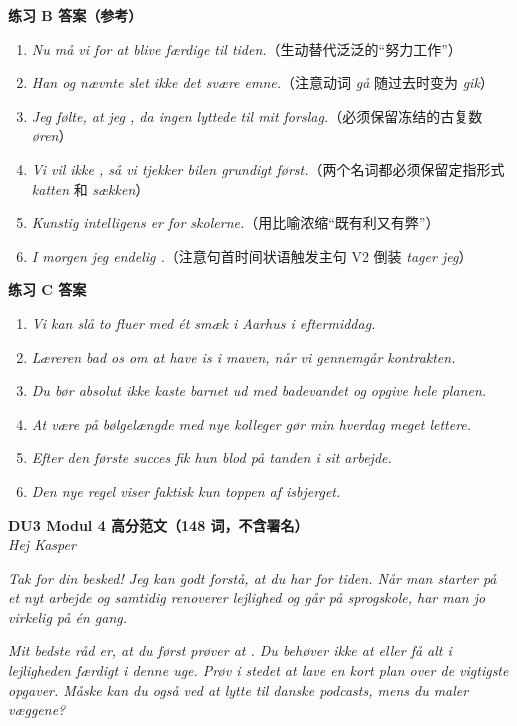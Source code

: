 \begin{answerbox}
\textbf{练习 B 答案（参考）}
\begin{enumerate}
  \item \textit{Nu må vi  for at blive færdige til tiden.}（生动替代泛泛的“努力工作”）
  \item \textit{Han  og nævnte slet ikke det svære emne.}（注意动词 \textit{gå} 随过去时变为 \textit{gik}）
  \item \textit{Jeg følte, at jeg , da ingen lyttede til mit forslag.}（必须保留冻结的古复数 \textit{øren}）
  \item \textit{Vi vil ikke , så vi tjekker bilen grundigt først.}（两个名词都必须保留定指形式 \textit{katten} 和 \textit{sækken}）
  \item \textit{Kunstig intelligens er  for skolerne.}（用比喻浓缩“既有利又有弊”）
  \item \textit{I morgen  jeg endelig .}（注意句首时间状语触发主句 V2 倒装 \textit{tager jeg}）
\end{enumerate}

\textbf{练习 C 答案}
\begin{enumerate}
  \item \textit{Vi kan slå to fluer med ét smæk i Aarhus i eftermiddag.}
  \item \textit{Læreren bad os om at have is i maven, når vi gennemgår kontrakten.}
  \item \textit{Du bør absolut ikke kaste barnet ud med badevandet og opgive hele planen.}
  \item \textit{At være på bølgelængde med nye kolleger gør min hverdag meget lettere.}
  \item \textit{Efter den første succes fik hun blod på tanden i sit arbejde.}
  \item \textit{Den nye regel viser faktisk kun toppen af isbjerget.}
\end{enumerate}

\textbf{DU3 Modul 4 高分范文（148 词，不含署名）}\\
\textit{Hej Kasper}

\textit{Tak for din besked! Jeg kan godt forstå, at du har  for tiden. Når man starter på et nyt arbejde og samtidig renoverer lejlighed og går på sprogskole, har man jo virkelig  på én gang.}

\textit{Mit bedste råd er, at du først prøver at . Du behøver ikke at  eller få alt i lejligheden færdigt i denne uge. Prøv i stedet at lave en kort plan over de vigtigste opgaver. Måske kan du også  ved at lytte til danske podcasts, mens du maler væggene?}


\end{answerbox}
